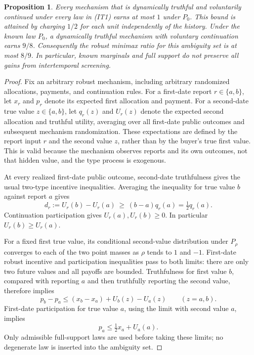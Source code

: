 \documentclass[11pt,a4paper]{article}
\newtheorem{proposition}[theorem]{Proposition}
\begin{document}
\begin{proposition}\label{prop:intertemporal-loss}
Every mechanism that is dynamically truthful and voluntarily continued
under every law in \textup{(IT1)} earns at most $1$ under $P_0$. This bound
is attained by charging $1/2$ for each unit independently of the history.
Under the known law $P_0$, a dynamically truthful mechanism with voluntary
continuation earns $9/8$. Consequently the robust minimax ratio for this
ambiguity set is at most $8/9$. In particular, known marginals and full
support do not preserve all gains from intertemporal screening.
\end{proposition}

\begin{proof}
Fix an arbitrary robust mechanism, including arbitrary randomized
allocations, payments, and continuation rules. For a first-date report
$r\in\{a,b\}$, let $x_r$ and $p_r$ denote its expected first allocation
and payment. For a second-date true value $z\in\{a,b\}$, let $q_r(z)$
and $U_r(z)$ denote the expected second allocation and truthful utility,
averaging over all first-date public outcomes and subsequent mechanism
randomization. These expectations are defined by the report input $r$
and the second value $z$, rather than by the buyer's true first value.
This is valid because the mechanism observes reports and its own outcomes,
not that hidden value, and the type process is exogenous.

At every realized first-date public outcome, second-date truthfulness
gives the usual two-type incentive inequalities. Averaging the inequality
for true value $b$ against report $a$ gives
\[
 d_r:=U_r(b)-U_r(a)\ \geq\ (b-a)q_r(a)=\tfrac12q_r(a).
 \tag{IT2}
\]
Continuation participation gives $U_r(a),U_r(b)\geq0$. In particular
$U_r(b)\geq U_r(a)$.

For a fixed first true value, its conditional second-value distribution
under $P_\rho$ converges to each of the two point masses as $\rho$ tends
to $1$ and $-1$. First-date robust incentive and participation inequalities
pass to both limits: there are only two future values and all payoffs are
bounded. Truthfulness for first value $b$, compared with reporting $a$
and then truthfully reporting the second value, therefore implies
\[
 p_b-p_a\leq (x_b-x_a)+U_b(z)-U_a(z)
 \qquad(z=a,b).
 \tag{IT3}
\]
First-date participation for true value $a$, using the limit with second
value $a$, implies
\[
 p_a\leq\tfrac12x_a+U_a(a).
 \tag{IT4}
\]
Only admissible full-support laws are used before taking these limits;
no degenerate law is inserted into the ambiguity set.


\end{proof}
\end{document}
